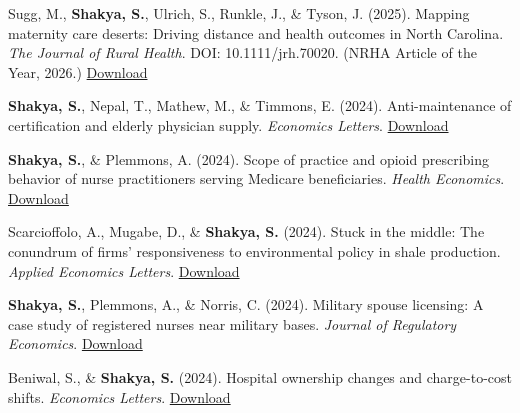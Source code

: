 \begin{etaremune}
\item Sugg, M., \textbf{Shakya, S.}, Ulrich, S., Runkle, J., \& Tyson, J. (2025). Mapping maternity care deserts: Driving distance and health outcomes in North Carolina. \textit{The Journal of Rural Health}. DOI: 10.1111/jrh.70020. (NRHA Article of the Year, 2026.) \hfill \href{https://www.dropbox.com/scl/fi/6vupzn4iwu2jzzl4gnhtc/The-Journal-of-Rural-Health-2025-Sugg-Mapping-maternity-care-deserts-Driving-distance-and-health-outcomes-in-North.pdf?rlkey=zia9y7p4vinyz5uc72q0lzuct&st=g5om58hn&dl=0}{Download}

\item \textbf{Shakya, S.}, Nepal, T., Mathew, M., \& Timmons, E. (2024). Anti-maintenance of certification and elderly physician supply. \textit{Economics Letters}. \hfill \href{https://www.dropbox.com/scl/fi/fqb0916bkwk97m4we1riz/Anti-maintenance-of-certification-and-elderly-physician-supply.pdf?rlkey=2qqz14u2x47qfjy7ravd7d0o7&st=r1x2agmo&dl=0}{Download}

\item \textbf{Shakya, S.}, \& Plemmons, A. (2024). Scope of practice and opioid prescribing behavior of nurse practitioners serving Medicare beneficiaries. \textit{Health Economics}. \hfill \href{https://www.dropbox.com/scl/fi/wfmbm1mc9hqyzhkqp9rxh/Shakya-Plemmons-HE-2024.pdf?rlkey=nlb07mwl20nsox976xla7inhg&st=kp9of3qz&dl=0}{Download}

\item Scarcioffolo, A., Mugabe, D., \& \textbf{Shakya, S.} (2024). Stuck in the middle: The conundrum of firms' responsiveness to environmental policy in shale production. \textit{Applied Economics Letters}. \hfill \href{https://www.dropbox.com/scl/fi/w5kh21t0f5q2uiqjpei98/Stuck-in-the-middle-the-conundrum-of-firms-responsiveness-to-environmental-policy-in-shale-production.pdf?rlkey=j0hb5mevqm08lm11dp9zjscdn&dl=0}{Download}

\item \textbf{Shakya, S.}, Plemmons, A., \& Norris, C. (2024). Military spouse licensing: A case study of registered nurses near military bases. \textit{Journal of Regulatory Economics}. \hfill \href{https://link.springer.com/article/10.1007/s11149-024-09480-7}{Download}

\item Beniwal, S., \& \textbf{Shakya, S.} (2024). Hospital ownership changes and charge-to-cost shifts. \textit{Economics Letters}. \hfill \href{https://www.dropbox.com/scl/fi/nob6hng0eydoob8ja7d1h/HospitalOwnershipChangeAndCostAnalysis.pdf?rlkey=2qaufyd6evfcatbbtmcwxnex8&dl=0}{Download}


\end{etaremune}
